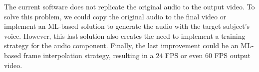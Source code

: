 \documentclass[preprint]{elsarticle}
\begin{document}
The current software does not replicate the original audio to the output video. To solve this problem, we could copy the original audio to the final video or implement an ML-based solution to generate the audio with the target subject's voice. However, this last solution also creates the need to implement a training strategy for the audio component. Finally, the last improvement could be an ML-based frame interpolation strategy, resulting in a $24$ FPS or even 60 FPS output video.



  

\end{document}
